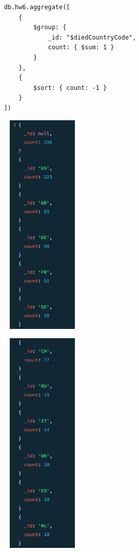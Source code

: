 \documentclass{article}
\begin{document}
\begin{verbatim}
    db.hw6.aggregate([
        {
            $group: {
                _id: "$diedCountryCode",
                count: { $sum: 1 }
            }
        },
        {
            $sort: { count: -1 }
        }
    ])
\end{verbatim}

\begin{multicols*}{3}
    \begin{figure}[H]
        \includegraphics[width=0.3\textwidth]{images/q2a.png}
    \end{figure}

    \columnbreak

    \begin{figure}[H]
        \includegraphics[width=0.3\textwidth]{images/q2b.png}
    \end{figure}


\end{multicols*}
\end{document}
